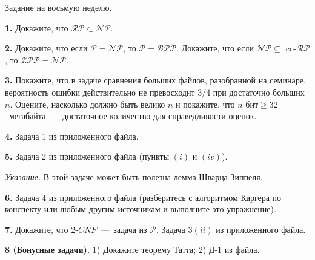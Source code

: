 \documentclass[12pt,a5paper,fleqn]{article}
\begin{document}
\begin{center}
{ \Large Задание на восьмую неделю.}

\end{center}

{\bf 1.} Докажите, что $\mathcal{RP}\subset \mathcal{NP}$.

{\bf 2.} Докажите, что если $\mathcal{P} = \mathcal{NP}$, то $\mathcal{P} = \mathcal{BPP}$. Докажите, что если $\mathcal{NP} \subseteq $ co-$\mathcal{RP}$, то $\mathcal{ZPP} = \mathcal{NP}$.

{\bf 3.} Покажите, что в задаче сравнения больших файлов, разобранной на семинаре, вероятность ошибки действительно не превосходит $3/4$ при достаточно больших $n$. Оцените, насколько должно быть велико $n$ и покажите, что $n \textrm{ бит} \geq 32$~мегабайта~---~достаточное количество для справедливости оценок.

{\bf 4.} Задача 1 из приложенного файла.

{\bf 5.} Задача 2 из приложенного файла (пункты $(i)$ и $(iv)$). 

\textit{Указание.} В этой задаче может быть полезна лемма Шварца-Зиппеля.

{\bf 6.} Задача 4 из приложенного файла (разберитесь с алгоритмом Каргера по конспекту или любым другим источникам и выполните это упражнение).

{\bf 7.} Докажите, что 2-$CNF$~---~задача из $\mathcal{P}$. Задача 3$(ii)$ из приложенного файла. 

{\bf 8 (Бонусные задачи).} 1) Докажите теорему Татта; 2) Д-1 из файла.
\end{document}

